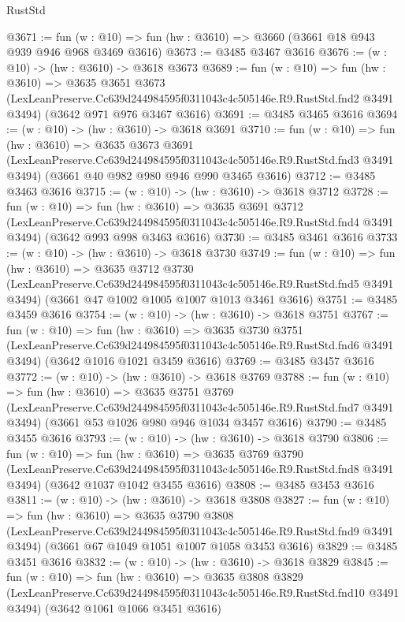 \begin{lexlean}{RustStd}
\begin{coremodule}
@3671 := fun (w : @10) => fun (hw : @3610) => @3660 (@3661 @18 @943 @939 @946 @968 @3469 @3616)
@3673 := @3485 @3467 @3616
@3676 := (w : @10) -> (hw : @3610) -> @3618 @3673
@3689 := fun (w : @10) =>
  fun (hw : @3610) =>
  @3635
    @3651
    @3673
    (LexLeanPreserve.Cc639d244984595f0311043c4c505146e.R9.RustStd.fnd2 @3491 @3494)
    (@3642 @971 @976 @3467 @3616)
@3691 := @3485 @3465 @3616
@3694 := (w : @10) -> (hw : @3610) -> @3618 @3691
@3710 := fun (w : @10) =>
  fun (hw : @3610) =>
  @3635
    @3673
    @3691
    (LexLeanPreserve.Cc639d244984595f0311043c4c505146e.R9.RustStd.fnd3 @3491 @3494)
    (@3661 @40 @982 @980 @946 @990 @3465 @3616)
@3712 := @3485 @3463 @3616
@3715 := (w : @10) -> (hw : @3610) -> @3618 @3712
@3728 := fun (w : @10) =>
  fun (hw : @3610) =>
  @3635
    @3691
    @3712
    (LexLeanPreserve.Cc639d244984595f0311043c4c505146e.R9.RustStd.fnd4 @3491 @3494)
    (@3642 @993 @998 @3463 @3616)
@3730 := @3485 @3461 @3616
@3733 := (w : @10) -> (hw : @3610) -> @3618 @3730
@3749 := fun (w : @10) =>
  fun (hw : @3610) =>
  @3635
    @3712
    @3730
    (LexLeanPreserve.Cc639d244984595f0311043c4c505146e.R9.RustStd.fnd5 @3491 @3494)
    (@3661 @47 @1002 @1005 @1007 @1013 @3461 @3616)
@3751 := @3485 @3459 @3616
@3754 := (w : @10) -> (hw : @3610) -> @3618 @3751
@3767 := fun (w : @10) =>
  fun (hw : @3610) =>
  @3635
    @3730
    @3751
    (LexLeanPreserve.Cc639d244984595f0311043c4c505146e.R9.RustStd.fnd6 @3491 @3494)
    (@3642 @1016 @1021 @3459 @3616)
@3769 := @3485 @3457 @3616
@3772 := (w : @10) -> (hw : @3610) -> @3618 @3769
@3788 := fun (w : @10) =>
  fun (hw : @3610) =>
  @3635
    @3751
    @3769
    (LexLeanPreserve.Cc639d244984595f0311043c4c505146e.R9.RustStd.fnd7 @3491 @3494)
    (@3661 @53 @1026 @980 @946 @1034 @3457 @3616)
@3790 := @3485 @3455 @3616
@3793 := (w : @10) -> (hw : @3610) -> @3618 @3790
@3806 := fun (w : @10) =>
  fun (hw : @3610) =>
  @3635
    @3769
    @3790
    (LexLeanPreserve.Cc639d244984595f0311043c4c505146e.R9.RustStd.fnd8 @3491 @3494)
    (@3642 @1037 @1042 @3455 @3616)
@3808 := @3485 @3453 @3616
@3811 := (w : @10) -> (hw : @3610) -> @3618 @3808
@3827 := fun (w : @10) =>
  fun (hw : @3610) =>
  @3635
    @3790
    @3808
    (LexLeanPreserve.Cc639d244984595f0311043c4c505146e.R9.RustStd.fnd9 @3491 @3494)
    (@3661 @67 @1049 @1051 @1007 @1058 @3453 @3616)
@3829 := @3485 @3451 @3616
@3832 := (w : @10) -> (hw : @3610) -> @3618 @3829
@3845 := fun (w : @10) =>
  fun (hw : @3610) =>
  @3635
    @3808
    @3829
    (LexLeanPreserve.Cc639d244984595f0311043c4c505146e.R9.RustStd.fnd10 @3491 @3494)
    (@3642 @1061 @1066 @3451 @3616)

\end{coremodule}
\end{lexlean}
